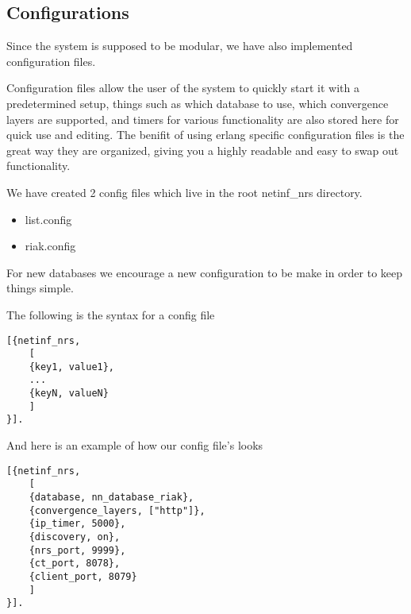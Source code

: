 \subsection {Configurations}

Since the system is supposed to be modular, we have also implemented configuration files. 

Configuration files allow the user of the system to quickly start it with a predetermined setup, things such as which database to use, which convergence layers are supported, and timers for various functionality are also stored here for quick use and editing. The benifit of using erlang specific configuration files is the great way they are organized, giving you a highly readable and easy to swap out functionality. 

We have created 2 config files which live in the root netinf\_nrs directory.

\begin {itemize}
\item list.config
\item riak.config
\end {itemize}

For new databases we encourage a new configuration to be make in order to keep things simple.


The following is the syntax for a config file 

\begin {verbatim}
[{netinf_nrs,
	[
	{key1, value1},
	...
	{keyN, valueN}
	]
}].

\end{verbatim}
And here is an example of how our config file's looks
\begin {verbatim}
[{netinf_nrs,
	[
	{database, nn_database_riak},
	{convergence_layers, ["http"]},
	{ip_timer, 5000},
	{discovery, on},
	{nrs_port, 9999},
	{ct_port, 8078},
	{client_port, 8079}
	]
}].

\end{verbatim}

